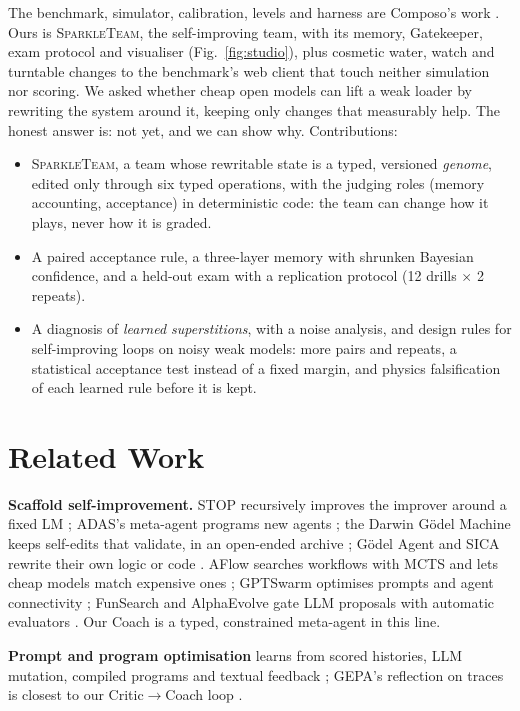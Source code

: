 \documentclass[9pt,twocolumn,letterpaper]{extarticle}
\newcommand{\ST}{\textsc{SparkleTeam}}
\begin{document}
The benchmark, simulator, calibration, levels and harness are Composo's work
\citep{composo2026dishwasherbench}. Ours is \ST, the self-improving team, with its memory,
Gatekeeper, exam protocol and visualiser (Fig.~\ref{fig:studio}), plus cosmetic water, watch and turntable changes to the
benchmark's web client that touch neither simulation nor scoring. We asked whether cheap open
models can lift a weak loader by rewriting the system around it, keeping only changes that
measurably help. The honest answer is: not yet, and we can show why. Contributions:
\begin{itemize}
\item \ST, a team whose rewritable state is a typed, versioned \emph{genome}, edited only through six
typed operations, with the judging roles (memory accounting, acceptance) in deterministic code: the
team can change how it plays, never how it is graded.
\item A paired acceptance rule, a three-layer memory with shrunken Bayesian confidence, and a
held-out exam with a replication protocol (12 drills $\times$ 2 repeats).
\item A diagnosis of \emph{learned superstitions}, with a noise analysis, and design rules for
self-improving loops on noisy weak models: more pairs and repeats, a statistical acceptance test
instead of a fixed margin, and physics falsification of each learned rule before it is kept.
\end{itemize}

\section{Related Work}
\textbf{Scaffold self-improvement.} STOP recursively improves the improver around a fixed LM
\citep{zelikman2023stop}; ADAS's meta-agent programs new agents \citep{hu2024adas}; the Darwin
G\"odel Machine keeps self-edits that validate, in an open-ended archive \citep{zhang2025dgm};
G\"odel Agent and SICA rewrite their own logic or code \citep{yin2024godel,robeyns2025sica}. AFlow
searches workflows with MCTS and lets cheap models match expensive ones \citep{zhang2024aflow};
GPTSwarm optimises prompts and agent connectivity \citep{zhuge2024gptswarm}; FunSearch and
AlphaEvolve gate LLM proposals with automatic evaluators
\citep{romeraparedes2024funsearch,novikov2025alphaevolve}. Our Coach is a typed, constrained meta-agent in this line.

\textbf{Prompt and program optimisation} learns from scored histories, LLM mutation, compiled
programs and textual feedback \citep{yang2023opro,fernando2023promptbreeder,guo2023evoprompt,khattab2023dspy,opsahlong2024mipro,yuksekgonul2024textgrad,cheng2024trace};
GEPA's reflection on traces is closest to our Critic$\to$Coach loop \citep{agrawal2025gepa}.
\end{document}
